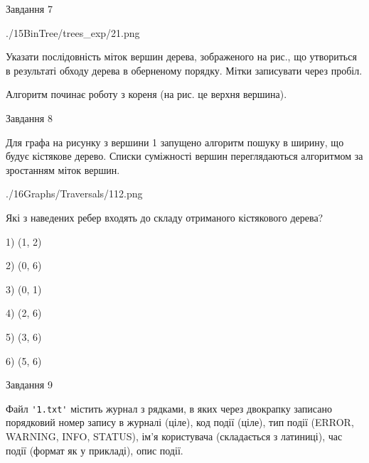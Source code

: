 \documentclass[12pt, ukrainian]{article}
\def\code#1{\Verb!#1!}
\begin{document}
{\vspace{10mm}\par

\newpage
\begin{minipage}[t]{9.7cm}
               
{\begin{center}Завдання {7}\end{center}}
\vspace{-6mm}

\begin{center}
	{./15BinTree/trees_exp/21.png}
\end{center}
Указати послідовність міток вершин дерева, зображеного на рис., що утвориться в результаті обходу дерева в оберненому порядку. Мітки записувати через пробіл.\par Алгоритм починає роботу з кореня (на рис. це верхня вершина).\par

\end{minipage}
\vline \hspace{8mm}
\begin{minipage}[t]{8.0cm}
               
{\begin{center}Завдання {8}\end{center}}
\vspace{-6mm}
Для графа на рисунку з вершини 1 запущено алгоритм пошуку в ширину, що будує кістякове дерево. Списки суміжності вершин переглядаються алгоритмом за зростанням міток вершин.\par
\begin{center}
	{./16Graphs/Traversals/112.png}
\end{center}
\par Які з наведених ребер входять до складу отриманого кістякового дерева?\par
1) (1, 2)\par
2) (0, 6)\par
3) (0, 1)\par
4) (2, 6)\par
5) (3, 6)\par
6) (5, 6)\par
{\vskip 15pt} \par

\end{minipage}

               
{\begin{center}Завдання {9}\end{center}}
\vspace{-6mm}
Файл \code{'1.txt'} містить журнал з рядками, в яких через двокрапку записано поряд\-ко\-вий номер запису в журналі (ціле), код події (ціле), тип події (ERROR, \\WARNING, INFO, STATUS), ім'я користувача (складається з латиниці), час події (фор\-мат як у прикладі), опис події.

}
\end{document}
